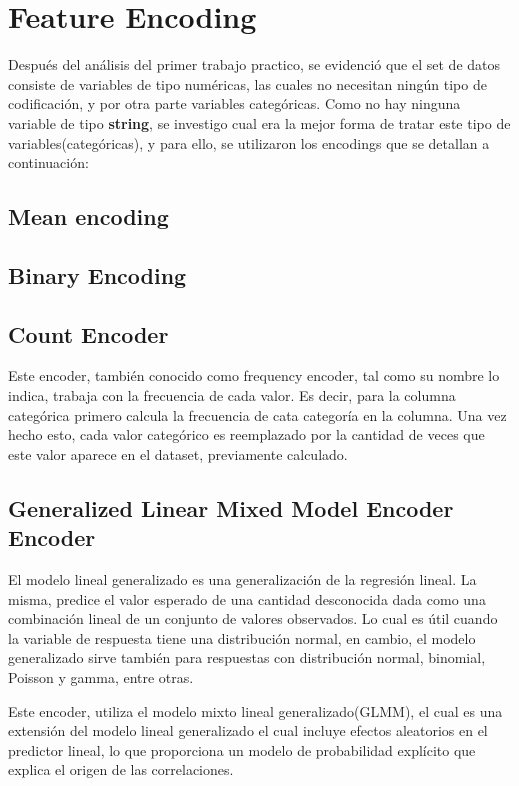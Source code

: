 \documentclass[12pt,a4paper]{article}
\begin{document}
\section{Feature Encoding}
Después del análisis del primer trabajo practico, se evidenció que el set de datos consiste de variables de tipo numéricas, las cuales no necesitan ningún tipo de codificación, y por otra parte variables categóricas. Como no hay ninguna variable de tipo \textbf{string}, se investigo cual era la mejor forma de tratar este tipo de variables(categóricas), y para ello, se utilizaron los encodings que se detallan a continuación:

\subsection{Mean encoding}
\subsection{Binary Encoding}
\subsection{Count Encoder}
Este encoder, también conocido como frequency encoder, tal como su nombre lo indica, trabaja con la frecuencia de cada valor. Es decir, para la columna categórica primero calcula la frecuencia de cata categoría en la columna. Una vez hecho esto, cada valor categórico es reemplazado por la cantidad de veces que este valor aparece en el dataset, previamente calculado.

\subsection{Generalized Linear Mixed Model Encoder Encoder}

El modelo lineal generalizado es una generalización de la regresión lineal. La misma, predice el valor esperado de una cantidad desconocida dada como una combinación lineal de un conjunto de valores observados. Lo cual es útil cuando la variable de respuesta tiene una distribución normal, en cambio, el modelo generalizado sirve también para respuestas con distribución normal, binomial, Poisson y gamma, entre otras. \newline

Este encoder, utiliza el modelo mixto lineal generalizado(GLMM), el cual es una extensión del modelo lineal generalizado el cual incluye efectos aleatorios en el predictor lineal, lo que proporciona un modelo de probabilidad explícito que explica el origen de las correlaciones.\newline
\end{document}
